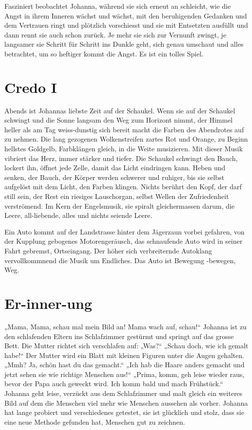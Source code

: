 \documentclass[10pt,a5paper]{book}
\begin{document}
Fasziniert beobachtet Johanna, während sie sich erneut an schleicht, wie die Angst in ihrem Inneren wächst und wächst, mit den beruhigenden Gedanken und dem Vertrauen ringt und plötzlich vorschiesst und sie mit Entsetzten ausfüllt und dann rennt sie auch schon zurück. Je mehr sie sich zur Vernunft zwingt, je langsamer sie Schritt für Schritt ins Dunkle geht, sich genau umschaut und alles betrachtet, um so heftiger kommt die Angst.
Es ist ein tolles Spiel.



\section*{Credo I}



Abends ist Johannas liebste Zeit auf der Schaukel. Wenn sie auf der Schaukel schwingt und die  Sonne langsam den Weg zum Horizont nimmt, der Himmel heller als am Tag weiss-dunstig sich bereit macht die Farben des Abendrotes auf zu nehmen. Die lang gezogenen Wolkenstreifen zartes Rot und Orange, zu Beginn hellstes Goldgelb, Farbklängen gleich, in die Weite musizieren. Mit dieser Musik vibriert das Herz, immer stärker und tiefer. Die Schaukel schwingt den Bauch, lockert ihn, öffnet jede Zelle, damit das Licht eindringen kann. Heben und senken, der Bauch, der Körper werden schwerer und ruhiger, bis sie selbst aufgelöst mit dem Licht, den Farben klingen. 
Nichts berührt den Kopf, der darf still sein, der Rest ein riesiges Lauschorgan, selbst Wellen der Zufriedenheit verströmend. Im Kern der Engelsmusik, sie spiralt gleichermassen darum, die Leere, all-liebende, alles und nichts seiende Leere.

Ein Auto kommt auf der Landstrasse hinter dem Jägerzaun vorbei gefahren, von der Kupplung gebogenes Motorengeräusch, das schnaufende Auto wird in seiner Fahrt gebremst, Ortseingang. Der höher sich verbreiternde Autoklang vervollkommnend die Musik um Endliches. Das Auto ist Bewegung -bewegen, Weg.
 


\section*{Er-inner-ung}



„Mama, Mama, schau mal mein Bild an! Mama wach auf, schau!“ Johanna ist zu den schlafenden Eltern ins Schlafzimmer gestürmt und springt auf das grosse Bett. Die Mutter richtet sich verschlafen auf: „Was?“ „Schau doch, wie ich gemalt habe!“ Der Mutter wird ein Blatt mit kleinen Figuren unter die Augen gehalten. „Mmh? Ja, schön hast du das gemacht.“ „Ich hab die Haare anders gemacht und jetzt sehen sie wie richtige Menschen aus!“ „Prima, komm, geh leise wieder raus, bevor der Papa auch geweckt wird. Ich komm bald und mach Frühstück.“ Johanna geht leise, verzückt aus dem Schlafzimmer und malt gleich ein weiteres Bild auf dem die Menschen viel mehr wie Menschen aussehen als vorher. Johanna hat lange probiert und verschiedenes getestet, sie ist glücklich und stolz, dass sie eine neue Methode gefunden hat, Menschen gut zu zeichnen.
\end{document}

